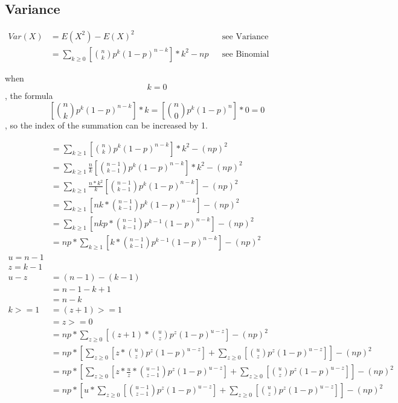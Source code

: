 \documentclass[]{book}
\begin{document}
\subsection {Variance}

\begin{align}
	Var(X) &= E(X^2) - E(X)^2 && \text{see Variance}\\
	&= \sum_{k \geqslant 0} {[\binom{n} {k} p^k (1-p)^{n-k}]*k^2} - np && \text{see Binomial Expected Value}
\end{align}

when $$k=0$$, the formula $$[\binom{n} {k} p^k (1-p)^{n-k}] * k = [\binom{n} {0} p^k (1-p)^n] * 0 = 0$$, so the index of the summation can be increased by 1.

\begin{align}
&= \sum_{k \geqslant 1} {[\binom{n} {k} p^k (1-p)^{n-k}]*k^2} - (np)^2\\
&= \sum_{k \geqslant 1} {\frac{n}{k} [\binom{n-1} {k-1} p^k (1-p)^{n-k}]*k^2} - (np)^2\\
&= \sum_{k \geqslant 1} {\frac{n*k^2}{k} [\binom{n-1} {k-1} p^k (1-p)^{n-k}]} - (np)^2\\
&= \sum_{k \geqslant 1} {[nk*\binom{n-1} {k-1} p^k (1-p)^{n-k}]} - (np)^2\\
&= \sum_{k \geqslant 1} {[nkp*\binom{n-1} {k-1} p^{k-1} (1-p)^{n-k}]} - (np)^2\\
&= np*\sum_{k \geqslant 1} {[k*\binom{n-1} {k-1} p^{k-1} (1-p)^{n-k}]} - (np)^2\\
u = n-1\\
z = k-1\\
u-z&=(n-1)-(k-1)\\
&=n-1-k+1\\
&=n-k\\
k >= 1 &= (z+1) >=1\\
&= z >= 0\\
&= np*\sum_{z \geqslant 0} {[(z+1)* \binom{u} {z} p^{z} (1-p)^{u-z}]} - (np)^2\\
&= np*[\sum_{z \geqslant 0} {[z*\binom{u} {z} p^{z} (1-p)^{u-z}]} + \sum_{z \geqslant 0} {[\binom{u} {z} p^{z} (1-p)^{u-z}]}] - (np)^2\\
&= np*[\sum_{z \geqslant 0} {[z*\frac{u}{z}*\binom{u-1} {z-1} p^{z} (1-p)^{u-z}]} + \sum_{z \geqslant 0} {[\binom{u} {z} p^{z} (1-p)^{u-z}]}] - (np)^2\\
&= np*[u*\sum_{z \geqslant 0} {[\binom{u-1} {z-1} p^{z} (1-p)^{u-z}]} + \sum_{z \geqslant 0} {[\binom{u} {z} p^{z} (1-p)^{u-z}]}] - (np)^2\\
\end{align}
\end{document}
